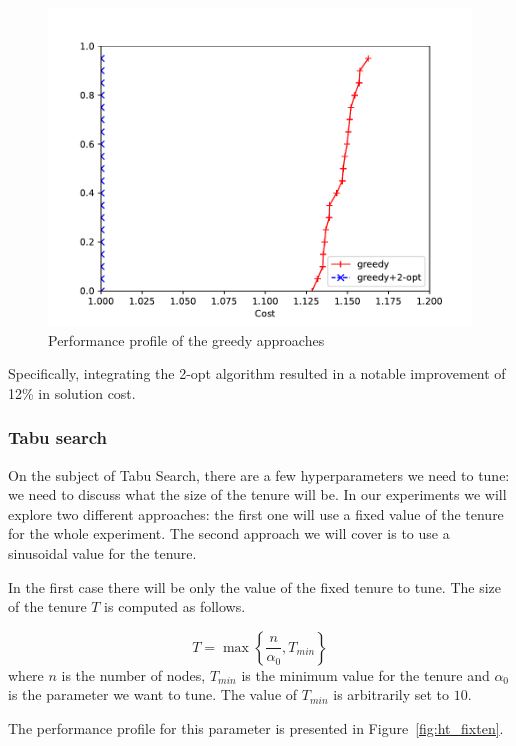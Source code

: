 \documentclass{article}
\begin{document}
\begin{figure}[ht]
        \caption{Performance profile of the greedy approaches}
        \label{fig:ht_greedy}
        \centering
        \includegraphics[width=340pt]{assets/ht_greedy.pdf}
\end{figure}

Specifically, integrating the 2-opt algorithm resulted in a notable improvement of 12\% in solution cost.

\clearpage

\subsubsection{Tabu search}
On the subject of Tabu Search, there are a few hyperparameters we need to tune:
we need to discuss what the size of the tenure will be. In our
experiments we will explore two different approaches: the first one will use
a fixed value of the tenure for the whole experiment. The second approach we
will cover is to use a sinusoidal value for the tenure.

In the first case there will be only the value of the fixed tenure to tune.
The size of the tenure $T$ is computed as follows.

\begin{equation*}
        T = \max \left\{
                \frac{n}{\alpha_0} ,
                T_{min}
        \right\}
\end{equation*}
where $n$ is the number of nodes, $T_{min}$ is the minimum value for the tenure
and $\alpha_0$ is the parameter we want to tune. The value of $T_{min}$ is arbitrarily
set to $10$.

The performance profile for this parameter is presented in Figure~\ref{fig:ht_fixten}.
\end{document}
